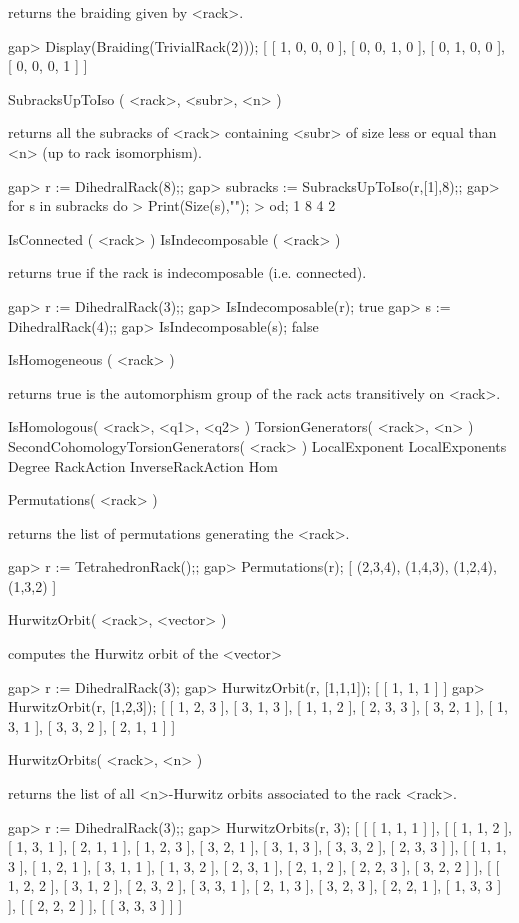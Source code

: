 returns the braiding given by <rack>.

\beginexample
gap> Display(Braiding(TrivialRack(2)));  
[ [  1,  0,  0,  0 ],
  [  0,  0,  1,  0 ],
  [  0,  1,  0,  0 ],
  [  0,  0,  0,  1 ] ]
\endexample

\>SubracksUpToIso ( <rack>, <subr>, <n> )

returns all the subracks of <rack> containing <subr> of size less or equal than
<n> (up to rack isomorphism).

\beginexample
gap> r := DihedralRack(8);;
gap> subracks := SubracksUpToIso(r,[1],8);;
gap> for s in subracks do
> Print(Size(s),"\n");
> od;
1
8
4
2
\endexample

\>IsConnected ( <rack> )
\>IsIndecomposable ( <rack> )

returns true if the rack is indecomposable (i.e. connected).

\beginexample
gap> r := DihedralRack(3);;
gap> IsIndecomposable(r);
true
gap> s := DihedralRack(4);;
gap> IsIndecomposable(s);
false
\endexample

\>IsHomogeneous ( <rack> )

returns true is the automorphism group of the rack acts transitively on <rack>.

\>IsHomologous( <rack>, <q1>, <q2> )
\>TorsionGenerators( <rack>, <n> )
\>SecondCohomologyTorsionGenerators( <rack> )
\>LocalExponent
\>LocalExponents
\>Degree
\>RackAction
\>InverseRackAction
\>Hom

\>Permutations( <rack> )

returns the list of permutations generating the <rack>.

\beginexample
gap> r := TetrahedronRack();;
gap> Permutations(r);
[ (2,3,4), (1,4,3), (1,2,4), (1,3,2) ]
\endexample

\>HurwitzOrbit( <rack>, <vector> )

computes the Hurwitz orbit of the <vector>

\beginexample
gap> r := DihedralRack(3);   
gap> HurwitzOrbit(r, [1,1,1]); 
[ [ 1, 1, 1 ] ]
gap> HurwitzOrbit(r, [1,2,3]);
[ [ 1, 2, 3 ], [ 3, 1, 3 ], [ 1, 1, 2 ], [ 2, 3, 3 ], [ 3, 2, 1 ], [ 1, 3, 1 ], [ 3, 3, 2 ], [ 2, 1, 1 ] ]
\endexample 

\>HurwitzOrbits( <rack>, <n> )

returns the list of all <n>-Hurwitz orbits associated to the rack <rack>.

\beginexample
gap> r := DihedralRack(3);;
gap> HurwitzOrbits(r, 3);
[ [ [ 1, 1, 1 ] ], [ [ 1, 1, 2 ], [ 1, 3, 1 ], [ 2, 1, 1 ], [ 1, 2, 3 ], [ 3, 2, 1 ], [ 3, 1, 3 ], [ 3, 3, 2 ], 
      [ 2, 3, 3 ] ], [ [ 1, 1, 3 ], [ 1, 2, 1 ], [ 3, 1, 1 ], [ 1, 3, 2 ], [ 2, 3, 1 ], [ 2, 1, 2 ], [ 2, 2, 3 ], 
      [ 3, 2, 2 ] ], [ [ 1, 2, 2 ], [ 3, 1, 2 ], [ 2, 3, 2 ], [ 3, 3, 1 ], [ 2, 1, 3 ], [ 3, 2, 3 ], [ 2, 2, 1 ], 
      [ 1, 3, 3 ] ], [ [ 2, 2, 2 ] ], [ [ 3, 3, 3 ] ] ]
\endexample

